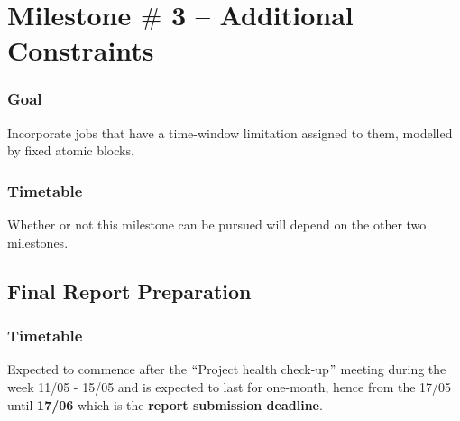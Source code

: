 \vspace{\baselineskip}
\section{Milestone $\#$ 3 – Additional Constraints}
\vspace{\baselineskip}
\subsubsection*{Goal}

Incorporate jobs that have a time-window limitation assigned to them, modelled by fixed atomic blocks.



\vspace{\baselineskip}
\subsubsection*{Timetable}

Whether or not this milestone can be pursued will depend on the other two milestones.



\vspace{\baselineskip}
\subsection*{Final Report Preparation}

\subsubsection*{Timetable}

Expected to commence after the $``$Project health check-up$"$  meeting during the week 11/05 - 15/05 and is expected to last for one-month, hence from the 17/05 until \textbf{17/06} which is the \textbf{report submission deadline}.





